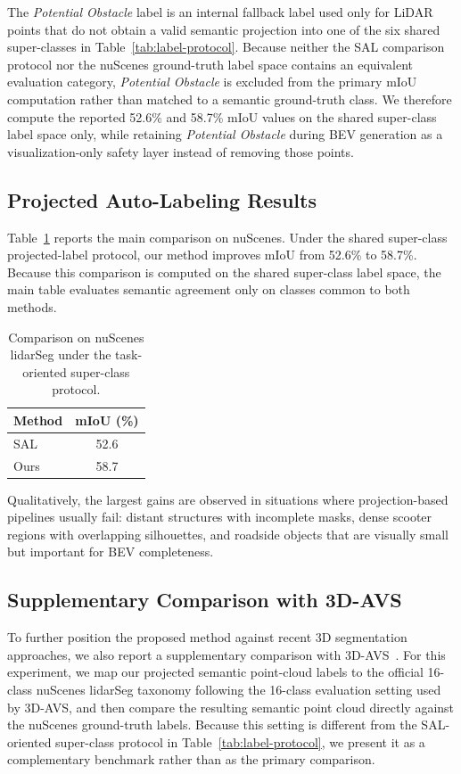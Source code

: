 \documentclass[conference]{IEEEtran}
\begin{document}
The \emph{Potential Obstacle} label is an internal fallback label used only for LiDAR points that do not obtain a valid semantic projection into one of the six shared super-classes in Table~\ref{tab:label-protocol}. Because neither the SAL comparison protocol nor the nuScenes ground-truth label space contains an equivalent evaluation category, \emph{Potential Obstacle} is excluded from the primary mIoU computation rather than matched to a semantic ground-truth class. We therefore compute the reported 52.6\% and 58.7\% mIoU values on the shared super-class label space only, while retaining \emph{Potential Obstacle} during BEV generation as a visualization-only safety layer instead of removing those points.

\subsection{Projected Auto-Labeling Results}
Table~\ref{tab:miou} reports the main comparison on nuScenes. Under the shared super-class projected-label protocol, our method improves mIoU from 52.6\% to 58.7\%. Because this comparison is computed on the shared super-class label space, the main table evaluates semantic agreement only on classes common to both methods.

\begin{table}[t]
  \caption{Comparison on nuScenes lidarSeg under the task-oriented super-class protocol.}
  \label{tab:miou}
  \centering
  \begin{tabular}{lc}
    \toprule
    Method & mIoU (\%) \\
    \midrule
    SAL~\cite{sal} & 52.6 \\
    Ours & 58.7 \\
    \bottomrule
  \end{tabular}
\end{table}

Qualitatively, the largest gains are observed in situations where projection-based pipelines usually fail: distant structures with incomplete masks, dense scooter regions with overlapping silhouettes, and roadside objects that are visually small but important for BEV completeness.

\subsection{Supplementary Comparison with 3D-AVS}
To further position the proposed method against recent 3D segmentation approaches, we also report a supplementary comparison with 3D-AVS~\cite{three_d_avs}. For this experiment, we map our projected semantic point-cloud labels to the official 16-class nuScenes lidarSeg taxonomy following the 16-class evaluation setting used by 3D-AVS, and then compare the resulting semantic point cloud directly against the nuScenes ground-truth labels. Because this setting is different from the SAL-oriented super-class protocol in Table~\ref{tab:label-protocol}, we present it as a complementary benchmark rather than as the primary comparison.
\end{document}
